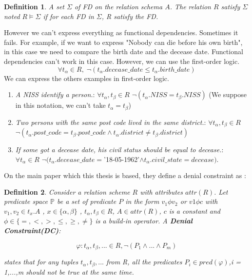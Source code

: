 \documentclass[letterpaper, 12pt]{report}
\newtheorem{mydef}{Definition}
\begin{document}
\begin{mydef}
A set $\Sigma$ of FD on the relation schema $A$. The relation $R$ satisfy $\Sigma$ noted $R \models \Sigma$ if for each FD in $\Sigma$, R satisfy the FD.
\end{mydef}

However we can't express everything as functional dependencies. Sometimes it fails. For example, if we want to express "Nobody can die before his own birth", in this case we need to compare the birth date and the decease date. Functional dependencies can't work in this case. However, we can use the first-order logic. 
$$\forall t_\alpha \in R, \; \neg(t_\alpha.decease\_date \leq t_\alpha.birth\_date)$$ We can express the others examples in first-order logic.

\begin{enumerate}
\item \emph{A NISS identify a person.}: $\forall t_\alpha,t_\beta \in R$ $\neg(t_\alpha.NISS = t_\beta.NISS)$ (We suppose in this notation, we can't take $t_\alpha = t_\beta$)
\item \emph{Two persons with the same post code lived in the same district.}: $\forall t_\alpha,t_\beta \in R$ $\neg(t_\alpha.post\_code = t_\beta.post\_code \wedge t_\alpha.district \neq t_\beta.district) $
\item \emph{If some got a decease date, his civil status should be equal to decease.}: $\forall t_\alpha \in R$ $\neg(t_\alpha.decease\_date = $'18-05-1962'$ \wedge t_\alpha.civil\_state = decease)$.
\end{enumerate}

On the main paper which this thesis is based, they define a denial constraint as \cite{main}:

\begin{mydef}
Consider a relation scheme $R$ with attributes $attr(R)$. Let predicate space $\mathbb{P}$ be a set of predicate  $P$ in the form  $v_1 \phi v_2$ or $v1 \phi c$ with $v_1,v_2 \in t_x.A$ , $x \in \{\alpha,\beta\}$ , $t_\alpha,t_\beta \in R$, $A \in attr(R)$, $c$ is a constant and $\phi \in \{ =,<,>,\leq, \geq, \neq \}$ is a build-in operator.  A \textbf{Denial Constraint(DC)}:

$$\varphi : t_\alpha,t_\beta,... \in R, \neg(P_1 \wedge ... \wedge P_m)$$

states that for any tuples $t_\alpha,t_\beta,...$ from R, all the predicates $P_i \in pred(\varphi)$,i = 1,...,m should not be true at the same time.
\end{mydef}
\end{document}

